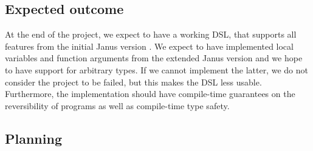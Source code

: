 \documentclass[12pt,a4paper]{article}
\begin{document}
\subsection{Expected outcome}
At the end of the project, we expect to have a working DSL, that supports all features from the initial Janus version \cite{lutz82}. We expect to have implemented local variables and function arguments from the extended Janus version \cite{yokoyama10} and we hope to have support for arbitrary types. If we cannot implement the latter, we do not consider the project to be failed, but this makes the DSL less usable. Furthermore, the implementation should have compile-time guarantees on the reversibility of programs as well as compile-time type safety. 

\subsection{Planning}
\setlength{\tabcolsep}{20pt}
\renewcommand{\arraystretch}{1.6}
\end{document}
